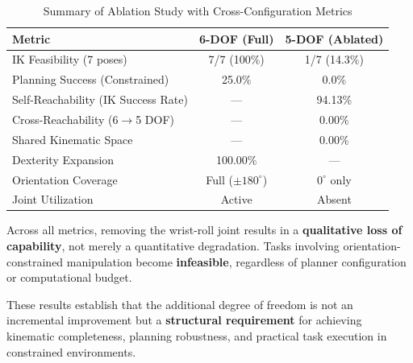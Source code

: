 \documentclass[conference]{IEEEtran}
\begin{document}
	\begin{table}[t]
		\centering
		\caption{Summary of Ablation Study with Cross-Configuration Metrics}
		\label{tab:ablation_summary}
		\begin{tabular}{l|c|c}
			\hline
			\textbf{Metric} & \textbf{6-DOF (Full)} & \textbf{5-DOF (Ablated)} \\
			\hline
			
			IK Feasibility (7 poses) & 7/7 (100\%) & 1/7 (14.3\%) \\
			
			Planning Success (Constrained) & 25.0\% & 0.0\% \\
			
			Self-Reachability (IK Success Rate) & --- & 94.13\% \\
			
			Cross-Reachability (6$\rightarrow$5 DOF) & --- & 0.00\% \\
			
			Shared Kinematic Space & --- & 0.00\% \\
			
			Dexterity Expansion & 100.00\% & --- \\
			
			Orientation Coverage & Full ($\pm180^\circ$) & $0^\circ$ only \\
			
			Joint Utilization & Active & Absent \\
			
			\hline
		\end{tabular}
	\end{table}
	
	Across all metrics, removing the wrist-roll joint results in a \textbf{qualitative loss of capability}, not merely a quantitative degradation. Tasks involving orientation-constrained manipulation become \textbf{infeasible}, regardless of planner configuration or computational budget.
	
	These results establish that the additional degree of freedom is not an incremental improvement but a \textbf{structural requirement} for achieving kinematic completeness, planning robustness, and practical task execution in constrained environments.
	
	
\end{document}
